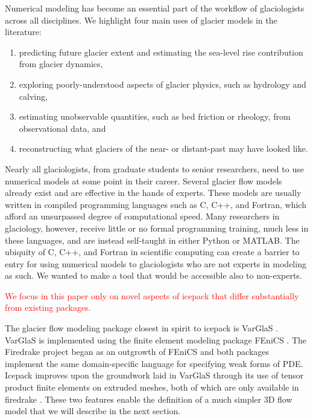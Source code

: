 \documentclass{article}
\theoremstyle{definition}
\theoremstyle{plain}
\begin{document}
Numerical modeling has become an essential part of the workflow of glaciologists across all disciplines.
We highlight four main uses of glacier models in the literature:
\begin{enumerate}
    \item predicting future glacier extent and estimating the sea-level rise contribution from glacier dynamics,
    \item exploring poorly-understood aspects of glacier physics, such as hydrology and calving,
    \item estimating unobservable quantities, such as bed friction or rheology, from observational data, and
    \item reconstructing what glaciers of the near- or distant-past may have looked like.
\end{enumerate}
Nearly all glaciologists, from graduate students to senior researchers, need to use numerical models at some point in their career.
Several glacier flow models already exist and are effective in the hands of experts.
These models are usually written in compiled programming languages such as C, C++, and Fortran, which afford an unsurpassed degree of computational speed.
Many researchers in glaciology, however, receive little or no formal programming training, much less in these languages, and are instead self-taught in either Python or MATLAB.
The ubiquity of C, C++, and Fortran in scientific computing can create a barrier to entry for using numerical models to glaciologists who are not experts in modeling as such.
We wanted to make a tool that would be accessible also to non-experts.

\textcolor{red}{We focus in this paper only on novel aspects of icepack that differ substantially from existing packages.}

The glacier flow modeling package closest in spirit to icepack is VarGlaS \citep{brinkerhoff2013data}.
VarGlaS is implemented using the finite element modeling package FEniCS \citep{logg2012automated}.
The Firedrake project began as an outgrowth of FEniCS and both packages implement the same domain-specific language for specifying weak forms of PDE.
Icepack improves upon the groundwork laid in VarGlaS through its use of tensor product finite elements on extruded meshes, both of which are only available in firedrake \citep{bercea2016structure, mcrae2016automated}.
These two features enable the definition of a much simpler 3D flow model that we will describe in the next section.
\end{document}
